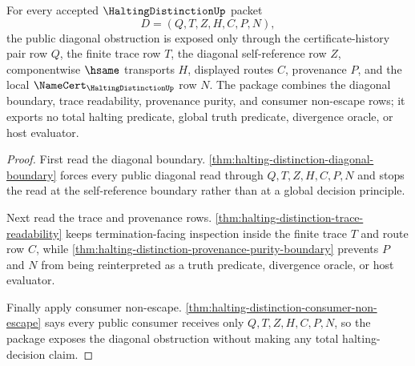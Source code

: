 \begin{theorem}
\label{thm:halting-distinction-diagonal-obstruction-public-package}
For every accepted $\HaltingDistinctionUp$ packet
$$
D=(Q,T,Z,H,C,P,N),
$$
the public diagonal obstruction is exposed only through the certificate-history pair row $Q$, the finite trace row $T$, the diagonal self-reference row $Z$, componentwise $\hsame$ transports $H$, displayed routes $C$, provenance $P$, and the local $\NameCert_{\HaltingDistinctionUp}$ row $N$. The package combines the diagonal boundary, trace readability, provenance purity, and consumer non-escape rows; it exports no total halting predicate, global truth predicate, divergence oracle, or host evaluator.
\end{theorem}
\begin{proof}
First read the diagonal boundary. \autoref{thm:halting-distinction-diagonal-boundary} forces every public diagonal read through $Q,T,Z,H,C,P,N$ and stops the read at the self-reference boundary rather than at a global decision principle.

Next read the trace and provenance rows. \autoref{thm:halting-distinction-trace-readability} keeps termination-facing inspection inside the finite trace $T$ and route row $C$, while \autoref{thm:halting-distinction-provenance-purity-boundary} prevents $P$ and $N$ from being reinterpreted as a truth predicate, divergence oracle, or host evaluator.

Finally apply consumer non-escape. \autoref{thm:halting-distinction-consumer-non-escape} says every public consumer receives only $Q,T,Z,H,C,P,N$, so the package exposes the diagonal obstruction without making any total halting-decision claim.
\end{proof}

